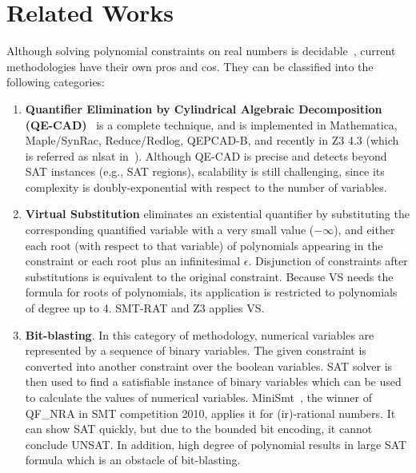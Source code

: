 \chapter{Related Works} \label{chap:related}
Although solving polynomial constraints on real numbers is decidable~\cite{tarski}, current methodologies have their own pros and cos. They can be classified into the following categories: 
\begin{enumerate}
\item \textbf{Quantifier Elimination by Cylindrical Algebraic Decomposition (QE-CAD)}~\cite{qecad} 
is a complete technique, and 
is implemented in Mathematica, Maple/SynRac, Reduce/Redlog, QEPCAD-B, and recently 
in
Z3 4.3 (which is referred as nlsat in~\cite{Jovanovic13}).
Although QE-CAD is precise and detects beyond SAT instances (e.g., SAT regions), 
scalability is still challenging, since its complexity is doubly-exponential with respect to the number of variables. 

\item \textbf{Virtual Substitution } eliminates an existential quantifier by substituting the corresponding quantified variable with a very small value ($-\infty$), and either each root (with respect to that variable) of polynomials appearing in the constraint or each root plus an infinitesimal $\epsilon$. Disjunction of constraints after substitutions is equivalent to the original constraint. Because VS needs the formula for roots of polynomials, its application is restricted to polynomials of degree up to 4. SMT-RAT and  
Z3 \cite{PBM12} applies VS.

\item \textbf{Bit-blasting}. 
In this category of methodology, numerical variables are represented by a sequence of binary variables. The given constraint is converted into another constraint over the boolean variables. SAT solver is then used to find a satisfiable instance of binary variables which can be used to calculate the values of numerical variables.  MiniSmt~\cite{Zankl:2010:SNR:1939141.1939168}, the winner of QF\_NRA in SMT competition 2010, 
applies it for (ir)-rational numbers.
It can show SAT quickly, but due to the bounded bit encoding, 
it cannot conclude UNSAT. In addition, high degree of polynomial results in large SAT formula which is an obstacle of bit-blasting.


\end{enumerate}
